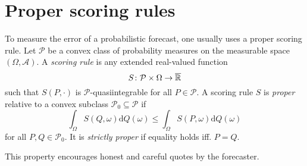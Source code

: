 \section{Proper scoring rules}
\label{sec:proper-scoring-rules}

To measure the error of a probabilistic forecast, one usually uses a 
proper scoring rule. 
Let \(\mathcal{P}\) be a convex class of probability measures on the 
measurable space \((\Omega, \mathcal{A})\).
A \textit{scoring rule} is any extended real-valued function 
\[ S\colon \mathcal{P} \times \Omega \rightarrow \overline{\mathbb{R}} \]
such that \(S(P, \cdot)\) is \(\mathcal{P}\)-quasiintegrable for all 
\(P\in \mathcal{P}\).
A scoring rule \(S\) is \textit{proper} relative to a convex subclass 
\(\mathcal{P}_0 \subseteq \mathcal{P}\) if
\[ \int_\Omega S(Q, \omega) \mathrm{d}Q(\omega) \leq \int_\Omega S(P, \omega) \mathrm{d}Q(\omega) \]
for all \(P, Q \in \mathcal{P}_0\). It is \textit{strictly proper} 
if equality holds iff. \(P = Q\).

This property encourages honest and careful quotes by the forecaster. 